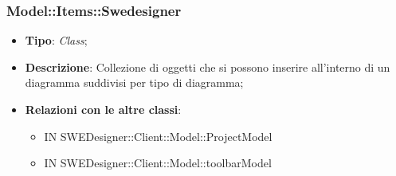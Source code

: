 \documentclass[../DefinizioneDiProdotto.tex]{subfiles}
\begin{document}
			\subsubsection{Model::Items::Swedesigner}
			\hypertarget{SWEDesigner::Client::Model::Items::Swedesigner}{}
			\begin{itemize}
				\item \textbf{Tipo}: \emph{Class};
				\item \textbf{Descrizione}: Collezione di oggetti che si possono inserire all'interno di un diagramma suddivisi per tipo di diagramma;
				\item \textbf{Relazioni con le altre classi}:
				\begin{itemize}
					\item IN SWEDesigner::Client::Model::ProjectModel
					\item IN SWEDesigner::Client::Model::toolbarModel
				\end{itemize}
			\end{itemize}
			
			
\end{document}
